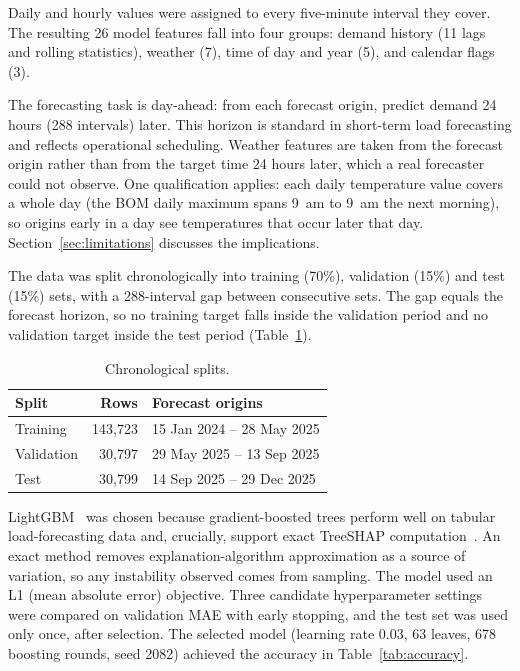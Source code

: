 \documentclass[11pt,a4paper]{article}
\begin{document}
Daily and hourly values were assigned to every five-minute interval they cover. The resulting 26 model features fall into four groups: demand history (11 lags and rolling statistics), weather (7), time of day and year (5), and calendar flags (3).

The forecasting task is day-ahead: from each forecast origin, predict demand 24 hours (288 intervals) later. This horizon is standard in short-term load forecasting and reflects operational scheduling. Weather features are taken from the forecast origin rather than from the target time 24 hours later, which a real forecaster could not observe. One qualification applies: each daily temperature value covers a whole day (the BOM daily maximum spans 9~am to 9~am the next morning), so origins early in a day see temperatures that occur later that day. Section~\ref{sec:limitations} discusses the implications.

The data was split chronologically into training (70\%), validation (15\%) and test (15\%) sets, with a 288-interval gap between consecutive sets. The gap equals the forecast horizon, so no training target falls inside the validation period and no validation target inside the test period (Table~\ref{tab:splits}).

\begin{table}[htbp]
\centering\small
\caption{Chronological splits.}
\label{tab:splits}
\begin{tabular}{lrl}
\toprule
Split & Rows & Forecast origins \\
\midrule
Training & 143{,}723 & 15 Jan 2024 -- 28 May 2025 \\
Validation & 30{,}797 & 29 May 2025 -- 13 Sep 2025 \\
Test & 30{,}799 & 14 Sep 2025 -- 29 Dec 2025 \\
\bottomrule
\end{tabular}
\end{table}

LightGBM~\cite{ke2017} was chosen because gradient-boosted trees perform well on tabular load-forecasting data and, crucially, support exact TreeSHAP computation~\cite{lundberg2020}. An exact method removes explanation-algorithm approximation as a source of variation, so any instability observed comes from sampling. The model used an L1 (mean absolute error) objective. Three candidate hyperparameter settings were compared on validation MAE with early stopping, and the test set was used only once, after selection. The selected model (learning rate 0.03, 63 leaves, 678 boosting rounds, seed 2082) achieved the accuracy in Table~\ref{tab:accuracy}.
\end{document}
